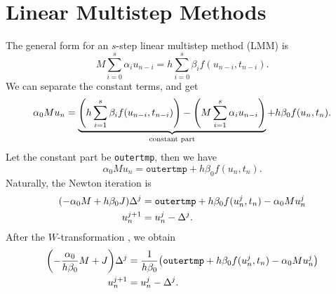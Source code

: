 \documentclass[a4paper,9pt]{article}
\theoremstyle{definition}
\theoremstyle{remark}
\begin{document}
\section{Linear Multistep Methods}
The general form for an $s$-step linear multistep method (LMM) is
\begin{equation}
  M \sum_{i=0}^s \alpha_{i} u_{n-i} = h \sum_{i=0}^s \beta_{i} f(u_{n-i},
  t_{n-i}).
\end{equation}
We can separate the constant terms, and get
\begin{equation}
  \alpha_{0} M u_{n} = \underbrace{\qty(h \sum_{i=1}^s \beta_{i} f(u_{n-i},
  t_{n-i})) - \qty(M \sum_{i=1}^s \alpha_{i} u_{n-i})}_\text{constant part} + h
  \beta_{0} f(u_{n}, t_{n}).
\end{equation}
Let the constant part be \texttt{outertmp}, then we have
\begin{equation}
  \alpha_{0} M u_{n} = \texttt{outertmp} + h \beta_{0} f(u_{n}, t_{n}).
\end{equation}
Naturally, the Newton iteration is
\begin{align}
  \qty(-\alpha_{0} M + h\beta_{0}J) \Delta^j &= \texttt{outertmp} + h \beta_{0}
  f(u^j_{n}, t_{n}) - \alpha_{0} M u^j_{n} \\
  u^{j+1}_n &= u^j_n - \Delta^j.
\end{align}
After the $W$-transformation \cite{hairer2010solving}, we obtain
\begin{align} \label{eq:newton_lmm}
  \qty(-\frac{\alpha_{0}}{h\beta_{0}} M + J) \Delta^j &=
  \frac{1}{h\beta_{0}} \qty(\texttt{outertmp} + h \beta_{0} f(u^j_{n}, t_{n}) -
  \alpha_{0} M u^j_{n}) \\
  u^{j+1}_n &= u^j_n - \Delta^j.
\end{align}
\end{document}
